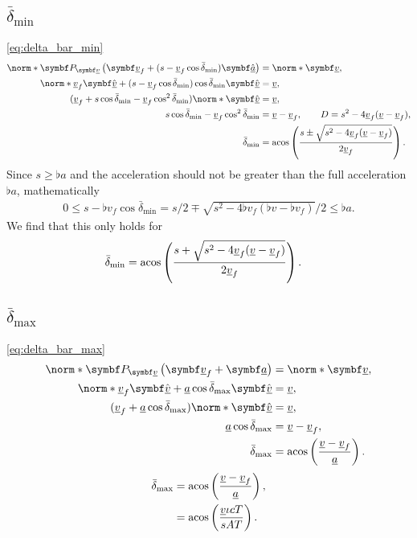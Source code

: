 \subsection{\texorpdfstring{$\bar{\delta}_{\min}$}{bar delta\_min}}
\eqref{eq:delta_bar_min}
\begin{align*}
\norm*{\projmat{\flat{v}} \left( \vec{\flat{v}}_f + (s - \flat{v}_f \cos\bar{\delta}_{\min})\uvec{\flat{a}} \right)} &= \norm*{\vec{\flat{v}}},\\
\norm*{\flat{v}_f \uvec{\flat{v}} + (s - \flat{v}_f \cos\bar{\delta}_{\min})\cos\bar{\delta}_{\min}\uvec{\flat{v}}} &= \flat{v},\\
(\flat{v}_f + s\cos\bar{\delta}_{\min} - \flat{v}_f \cos^2\bar{\delta}_{\min}) \norm*{\uvec{\flat{v}}} &= \flat{v},\\
s\cos\bar{\delta}_{\min} - \flat{v}_f \cos^2\bar{\delta}_{\min} &= \flat{v} - \flat{v}_f, \qquad D = s^2 - 4 \flat{v}_f (\flat{v} - \flat{v}_f),\\
\bar{\delta}_{\min} &= \acos\left( \frac{s \pm \sqrt{s^2 - 4 \flat{v}_f (\flat{v} - \flat{v}_f)}}{2 \flat{v}_f} \right).\\
\end{align*}
Since $s \ge \flat{a}$ and the acceleration should not be greater than the full acceleration $\flat{a}$, mathematically
\begin{align*}
0 \le s - \flat{v}_f \cos\bar{\delta}_{\min} = s / 2 \mp \sqrt{s^2 - 4 \flat{v}_f (\flat{v} - \flat{v}_f)} \Big/ 2 \le \flat{a}.
\end{align*}
We find that this only holds for
\begin{align*}
\bar{\delta}_{\min} &= \acos\left( \frac{s + \sqrt{s^2 - 4 \flat{v}_f (\flat{v} - \flat{v}_f)}}{2 \flat{v}_f} \right).
\end{align*}


\subsection{\texorpdfstring{$\bar{\delta}_{\max}$}{bar delta\_max}}
\eqref{eq:delta_bar_max}
\begin{align*}
\norm*{\projmat{\flat{v}}\left( \vec{\flat{v}}_f + \vec{\flat{a}} \right)} &= \norm*{\vec{\flat{v}}},\\
\norm*{\flat{v}_f \uvec{\flat{v}} + \flat{a} \cos\bar{\delta}_{\max}\uvec{\flat{v}}} &= \flat{v},\\
(\flat{v}_f + \flat{a} \cos\bar{\delta}_{\max}) \norm*{\uvec{\flat{v}}} &= \flat{v},\\
\flat{a} \cos\bar{\delta}_{\max} &= \flat{v} - \flat{v}_f,\\
\bar{\delta}_{\max} &= \acos\left( \frac{\flat{v} - \flat{v}_f}{\flat{a}} \right).
\end{align*}
\begin{align*}
\bar{\delta}_{\max} &= \acos\left( \frac{\flat{v} - \flat{v}_f}{\flat{a}} \right),\\
&= \acos\left( \frac{\flat{v} \iota cT}{sAT} \right).
\end{align*}

